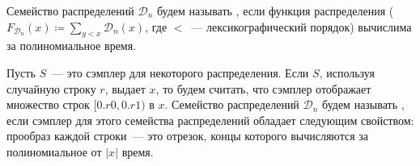 

\setcounter{curtask}{9}




\begin{definition*}
    Семейство распределений $\mathcal{D}_n$ будем называть ,
    если функция распределения ($F_{\mathcal{D}_n}(x) \coloneqq \sum\limits_{y < x} \mathcal{D}_n(x)$,
    где $<$~--- лексикографический порядок) вычислима за полиномиальное время.

    Пусть $S$~--- это сэмплер для некоторого распределения. Если $S$, используя случайную строку $r$,
    выдает $x$, то будем считать, что сэмплер отображает множество строк $[0.r0, 0.r1)$ в $x$. Семейство
    распределений $\mathcal{D}_n$ будем называть , если сэмплер для этого семейства
    распределений обладает следующим свойством: прообраз каждой строки~--- это отрезок, концы которого
    вычисляются за полиномиальное от $|x|$ время.
\end{definition*}



\breakline







